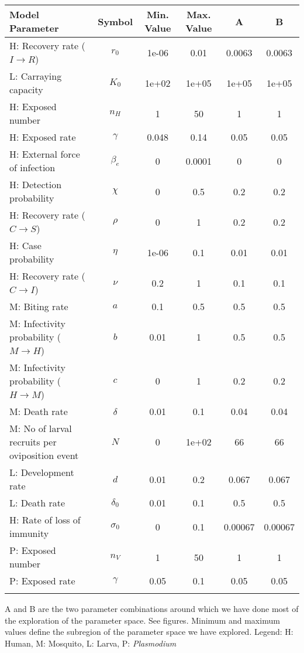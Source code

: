 \begin{table}
\noindent
\begin{tabular}{p{5cm}ccccc}
{\bf Model Parameter} & {\bf Symbol} & {\bf Min. Value} & {\bf Max. Value} & {\bf A} & {\bf B}\\
\hline\hline
  H: Recovery rate ($I \rightarrow R$) & $r_0$ & 1e-06 & 0.01 & 0.0063 & 0.0063\\
  L: Carraying capacity & $K_0$ & 1e+02 & 1e+05 & 1e+05 & 1e+05\\
  H: Exposed number & $n_H$ &    1 &   50 &    1 &    1\\
  H: Exposed rate & $\gamma$ & 0.048 & 0.14 & 0.05 & 0.05\\
  H: External force of infection & $\beta_e$ &    0 & 0.0001 &    0 &    0\\
  H: Detection probability & $\chi$ &    0 &  0.5 &  0.2 &  0.2\\
  H: Recovery rate ($C \rightarrow S$) & $\rho$ &    0 &    1 &  0.2 &  0.2\\
  H: Case probability & $\eta$ & 1e-06 &  0.1 & 0.01 & 0.01\\
  H: Recovery rate ($C \rightarrow I$) & $\nu$ &  0.2 &    1 &  0.1 &  0.1\\
  M: Biting rate & $a$ &  0.1 &  0.5 &  0.5 &  0.5\\
  M: Infectivity probability ($M \rightarrow H$) & $b$ & 0.01 &    1 &  0.5 &  0.5\\
  M: Infectivity probability ($H \rightarrow M$) & $c$ &    0 &    1 &  0.2 &  0.2\\
  M: Death rate & $\delta$ & 0.01 &  0.1 & 0.04 & 0.04\\
  M: No of larval recruits per oviposition event & $N$ &    0 & 1e+02 &   66 &   66\\
  L: Development rate & $d$ & 0.01 &  0.2 & 0.067 & 0.067\\
  L: Death rate & $\delta_0$ & 0.01 &  0.1 &  0.5 &  0.5\\
  H: Rate of loss of immunity & $\sigma_0$ &    0 &  0.1 & 0.00067 & 0.00067\\
  P: Exposed number & $n_V$ &    1 &   50 &    1 &    1\\
  P: Exposed rate & $\gamma$ & 0.05 &  0.1 & 0.05 & 0.05\\
\hline\hline
\smallskip
\end{tabular}
 A and B are the two parameter combinations around which we have done most of the exploration of the parameter space. See figures. Minimum and maximum values define the subregion of the parameter space we have explored. Legend: {\small H: Human, M: Mosquito, L: Larva, P: {\em Plasmodium}} 
\end{table}
